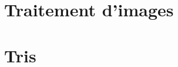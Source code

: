 \renewcommand{\td}{03_SelectionActivites}
\graphicspath{{\repStyle/png/}{\repExo/\td/images/}}



\section*{Traitement d'images}
\renewcommand{\repExo}{../../Informatique/S1_Themes/07_Images}

\renewcommand{\td}{01_TraitementImages}
\graphicspath{{\repStyle/png/}{\repExo/\td/images/}}


\renewcommand{\td}{02_Convolution}
\graphicspath{{\repStyle/png/}{\repExo/\td/images/}}


\section*{Tris}
\renewcommand{\repExo}{../../Informatique/S1_Themes/08_Tris}

\renewcommand{\td}{01_TriQuadratique}
\graphicspath{{\repStyle/png/}{\repExo/\td/images/}}


\renewcommand{\td}{02_TriFusion}
\graphicspath{{\repStyle/png/}{\repExo/\td/images/}}


\renewcommand{\td}{03_TriRapide}
\graphicspath{{\repStyle/png/}{\repExo/\td/images/}}


\renewcommand{\td}{04_TriComptage}
\graphicspath{{\repStyle/png/}{\repExo/\td/images/}}



%
%
%
%
%
%
